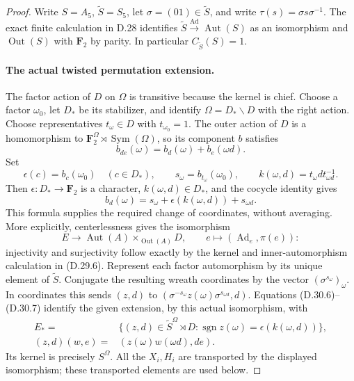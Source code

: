 \begin{proof}
Write $S=A_5$, $\widetilde S=S_5$, let
$\sigma=(01)\in\widetilde S$, and write
$\tau(s)=\sigma s\sigma^{-1}$.
The exact finite calculation in D.28 identifies
$\widetilde S\xrightarrow{\operatorname{Ad}}
\operatorname{Aut}(S)$ as an isomorphism and
$\operatorname{Out}(S)$ with $\mathbf F_2$ by parity.
In particular $C_{\widetilde S}(S)=1$.

\paragraph{The actual twisted permutation extension.}
The factor action of $D$ on $\Omega$ is transitive
because the kernel is chief.  Choose a factor
$\omega_0$, let $D_*$ be its stabilizer, and identify
$\Omega=D_*\backslash D$ with the right action.
Choose representatives $t_\omega\in D$ with
$t_{\omega_0}=1$.  The outer action of $D$ is a
homomorphism to
$\mathbf F_2^{\Omega}\rtimes\operatorname{Sym}(\Omega)$,
so its component $b$ satisfies
\[
 b_{de}(\omega)=b_d(\omega)+b_e(\omega d).
 \tag{D.30.4}
\]
Set
\[
 \epsilon(c)=b_c(\omega_0)\quad(c\in D_*),\qquad
 s_\omega=b_{t_\omega}(\omega_0),\qquad
 k(\omega,d)=t_\omega d t_{\omega d}^{-1}.
 \tag{D.30.5}
\]
Then $\epsilon:D_*\to\mathbf F_2$ is a character,
$k(\omega,d)\in D_*$, and the cocycle identity gives
\[
 b_d(\omega)=s_\omega+
        \epsilon(k(\omega,d))+s_{\omega d}.
 \tag{D.30.6}
\]
This formula supplies the required change of
coordinates, without averaging.  More explicitly,
centerlessness gives the isomorphism
\[
 E\longrightarrow
 \operatorname{Aut}(A)\times_{\operatorname{Out}(A)}D,
 \qquad e\longmapsto(\operatorname{Ad}_e,\pi(e)):
 \tag{D.30.7}
\]
injectivity and surjectivity follow exactly by the
kernel and inner-automorphism calculation in
\textup{(D.29.6)}.  Represent each factor automorphism
by its unique element of $\widetilde S$.  Conjugate
the resulting wreath coordinates by the vector
$(\sigma^{s_\omega})_\omega$.  In coordinates this
sends $(z,d)$ to
$(\sigma^{-s_\omega}z(\omega)\sigma^{s_{\omega d}},d)$.
Equations \textup{(D.30.6)--(D.30.7)} identify the
given extension, by this actual isomorphism, with
\[
 \begin{split}
 E_*={}&\{(z,d)\in\widetilde S^{\Omega}\rtimes D:
       \operatorname{sgn}z(\omega)
                   =\epsilon(k(\omega,d))\},\\
 (z,d)(w,e)={}&(z(\omega)w(\omega d),de).
 \end{split}
 \tag{D.30.8}
\]
Its kernel is precisely $S^{\Omega}$.  All the
$X_i,H_i$ are transported by the displayed
isomorphism; these transported elements are used
below.


\end{proof}
